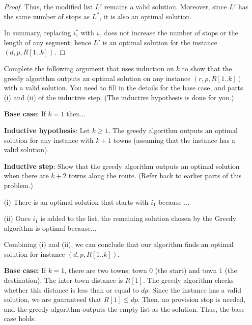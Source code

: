 \documentclass[11pt,fleqn]{exam}
\newenvironment{soln}{\color{solnblue}}{}
\newif\ifsolutions\solutionsfalse
\begin{document}
\begin{questions}
\begin{soln}
\begin{proof}
   Thus, the modified list \( L' \) remains a valid solution. Moreover, since \( L' \) 
   has the same number of stops as \( L^* \), it is also an optimal solution.
   
   In summary, replacing \( i_1^* \) with \( i_1 \) does not increase the number of stops or the 
   length of any segment; hence \( L' \) is an optimal solution for the instance \((d,p,R[1..k])\).
   \end{proof}
\end{soln}
   

\ifsolutions

\fi

\question[3]
Complete the following argument that uses induction on $k$ to show that the greedy algorithm
outputs an optimal solution
 on any instance $(r,p,R[1..k])$ with a valid solution. You need to fill in the details for 
the base case, and parts (i) and (ii) of the inductive step. (The inductive hypothesis is done for you.)

\vspace{.1in}

\noindent
{\bf Base case}: If $k = 1$ then...

\ifsolutions

\fi

\noindent
{\bf Inductive hypothesis}: Let $k\ge 1$.
The greedy algorithm outputs an optimal solution for any instance with $k+1$ towns (assuming that the instance has a valid solution).

\noindent
{\bf Inductive step}: Show that the greedy algorithm outputs an optimal
solution when there are $k+2$ towns along the route. (Refer back to earlier parts of this problem.)

(i) There is an optimal solution that starts with $i_1$ because ...

\ifsolutions
\begin{soln}
...the solution $L'$ constructed in part 4 is such a solution.
\end{soln}
\fi

(ii) Once $i_1$ is added to the list, the remaining solution chosen by the Greedy algorithm is optimal because...

\ifsolutions

\fi

\vspace{.1in}

Combining (i) and (ii), we can conclude that our algorithm finds an optimal solution for instance
$(d,p,R[1..k])$.

\begin{soln}
   \noindent
   \textbf{Base case:}  
   If \( k = 1 \), there are two towns: town \( 0 \) (the start) and town \( 1 \) (the destination).
    The inter-town distance is \( R[1] \).  
   The greedy algorithm checks whether this distance is less than or equal to \( dp \). 
   Since the instance has a valid solution, we are guaranteed that \( R[1] \le dp \). 
   Then, no provision stop is needed, and the greedy algorithm outputs 
   the empty list as the solution. Thus, the base case holds.
   

\end{soln}
\end{questions}
\end{document}
